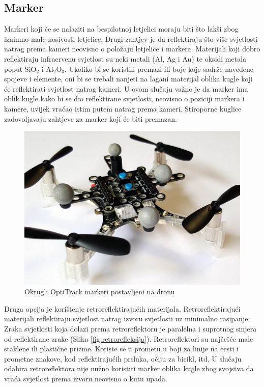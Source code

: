 \documentclass[times, utf8, diplomski]{fer}
\begin{document}
\subsection{Marker}
Markeri koji će se nalaziti na bespilotnoj letjelici moraju biti što lakši zbog iznimno male nosivosti letjelice. Drugi zahtjev je da reflektiraju što više svjetlosti natrag prema kameri neovisno o položaju letjelice i markera. Materijali koji dobro reflektiraju infracrvenu svjetlost su neki metali (Al, Ag i Au) te oksidi metala poput SiO$_2$ i Al$_2$O$_3$. Ukoliko bi se koristili premazi ili boje koje sadrže navedene spojeve i elemente, oni bi se trebali nanjeti na lagani materijal oblika kugle koji će reflektirati svjetlost natrag kameri. U ovom slučaju važno je da marker ima oblik kugle kako bi se dio reflektirane svjetlosti, neovisno o poziciji markera i kamere, uvijek vraćao istim putem natrag prema kameri. Stiroporne kuglice zadovoljavaju zahtjeve za marker koji će biti premazan.

\begin{figure}[h]
\centering
\includegraphics[width=.5\textwidth]{markers_dron}
\caption{Okrugli OptiTrack markeri postavljeni na dronu \protect\footnotemark}
\label{fig:opti_markers}
\end{figure}

Druga opcija je korištenje retroreflektirajućih materijala. Retroreflektirajući materijali reflektiraju svjetlost natrag izvoru svjetlosti uz minimalno rasipanje. Zraka svjetlosti koja dolazi prema retroreflektoru je paralelna i suprotnog smjera od reflektirane zrake (Slika \ref{fig:retrorefleksija}). Retroreflektori su najčešće male staklene ili plastične prizme. Koriste se u prometu u boji za linije na cesti i prometne znakove, kod reflektirajućih prsluka,  očiju za bicikl, itd. U slučaju odabira retroreflektora nije nužno koristiti marker oblika kugle zbog svojstva da vraća svjetlost prema izvoru neovisno o kutu upada.
\end{document}
